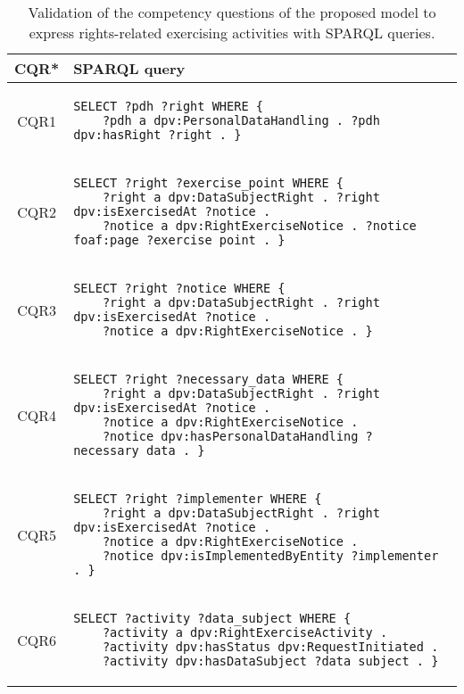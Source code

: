 \begin{table}[htp]
    \centering
    \caption{Validation of the competency questions of the proposed model to express rights-related exercising activities with SPARQL queries.}
    \label{tab:rights_cq_sparql}
    \begin{tabular}{c|l}
        \textbf{CQR*} & \textbf{SPARQL query} \\
        \hline\hline
        CQR1 & \begin{lstlisting}[numbers=none]
SELECT ?pdh ?right WHERE {
    ?pdh a dpv:PersonalDataHandling . ?pdh dpv:hasRight ?right . } \end{lstlisting} \\
        \hline
        CQR2 & \begin{lstlisting}[numbers=none]
SELECT ?right ?exercise_point WHERE {
    ?right a dpv:DataSubjectRight . ?right dpv:isExercisedAt ?notice . 
    ?notice a dpv:RightExerciseNotice . ?notice foaf:page ?exercise_point . } \end{lstlisting} \\
        \hline
        CQR3 & \begin{lstlisting}[numbers=none]
SELECT ?right ?notice WHERE {
    ?right a dpv:DataSubjectRight . ?right dpv:isExercisedAt ?notice . 
    ?notice a dpv:RightExerciseNotice . } \end{lstlisting} \\
        \hline
        CQR4 & \begin{lstlisting}[numbers=none]
SELECT ?right ?necessary_data WHERE {
    ?right a dpv:DataSubjectRight . ?right dpv:isExercisedAt ?notice . 
    ?notice a dpv:RightExerciseNotice .
    ?notice dpv:hasPersonalDataHandling ?necessary_data . } \end{lstlisting} \\
        \hline
        CQR5 & \begin{lstlisting}[numbers=none]
SELECT ?right ?implementer WHERE {
    ?right a dpv:DataSubjectRight . ?right dpv:isExercisedAt ?notice . 
    ?notice a dpv:RightExerciseNotice .
    ?notice dpv:isImplementedByEntity ?implementer . } \end{lstlisting} \\
        \hline
        CQR6 & \begin{lstlisting}[numbers=none]
SELECT ?activity ?data_subject WHERE {
    ?activity a dpv:RightExerciseActivity .
    ?activity dpv:hasStatus dpv:RequestInitiated . 
    ?activity dpv:hasDataSubject ?data_subject . } \end{lstlisting} \\

\end{tabular}
\end{table}
